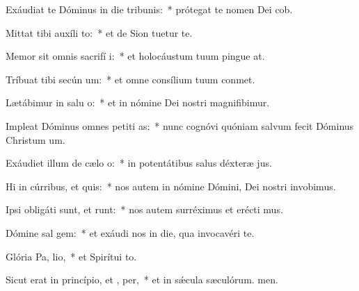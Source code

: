 \item Exáudiat te Dóminus in die tribunis:~* prótegat te nomen Dei cob.
\item Mittat tibi auxíli  to:~* et de Sion tuetur te.
\item Memor sit omnis sacrifí i:~* et holocáustum tuum pingue at.
\item Tríbuat tibi secún  um:~* et omne consílium tuum conmet.
\item Lætábimur in salu o:~* et in nómine Dei nostri magnifibimur.
\item Impleat Dóminus omnes petiti as:~* nunc cognóvi quóniam salvum fecit Dóminus Christum um.
\item Exáudiet illum de cælo  o:~* in potentátibus salus déxteræ jus.
\item Hi in cúrribus, et   quis:~* nos autem in nómine Dómini, Dei nostri invobimus.
\item Ipsi obligáti sunt, et runt:~* nos autem surréximus et erécti mus.
\item Dómine sal  gem:~* et exáudi nos in die, qua invocavéri te.
\item Glória Pa,  lio,~* et Spirítui to.
\item Sicut erat in princípio, et ,  per,~* et in sǽcula sæculórum. men.
